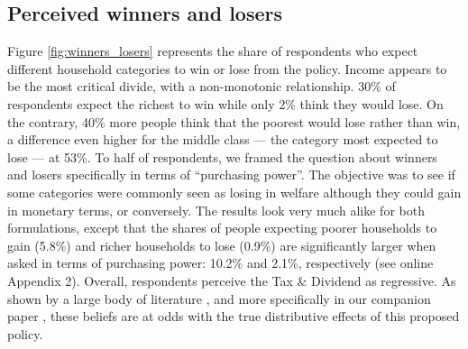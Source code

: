 \documentclass[english,5p,authoryear]{elsarticle}
\begin{document}
    \subsection{Perceived winners and losers}

Figure \ref{fig:winners_losers} represents the share of respondents who expect different household categories to win or lose from the policy. Income appears to be the most critical divide, with a non-monotonic relationship. 30\% of respondents expect the richest to win while only 2\% think they would lose. On the contrary, 40\% more people think that the poorest would lose rather than win, a difference even higher for the middle class --- the category most expected to lose --- at 53\%. To half of respondents, we framed the question about winners and losers specifically in terms of ``purchasing power''. The objective was to see if some categories were commonly seen as losing in welfare although they could gain in monetary terms, or conversely. The results look very much alike for both formulations, except that the shares of people expecting poorer households to gain (5.8\%) and richer households to lose (0.9\%) are significantly larger when asked in terms of purchasing power: 10.2\% and 2.1\%, respectively (see online Appendix 2). Overall, respondents perceive the Tax \& Dividend as regressive. As shown by a large body of literature \citep[e.g.][]{west_williams_04,bento_distributional_2009,williams_initial_2015}, and more specifically in our companion paper \citep{douenne_can_2019}, these beliefs are at odds with the true distributive effects of this proposed policy. %
\end{document}
